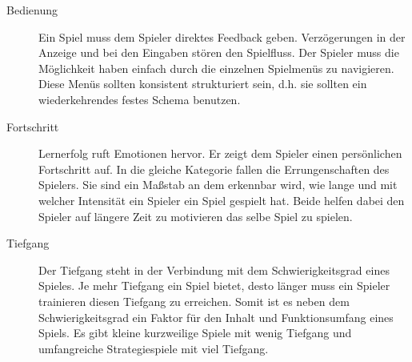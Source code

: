 \begin{description}



\item[Bedienung]
Ein Spiel muss dem Spieler direktes Feedback geben. Verzögerungen in der Anzeige und bei den Eingaben stören den Spielfluss. Der Spieler muss die Möglichkeit haben einfach durch die einzelnen Spielmenüs zu navigieren. Diese Menüs sollten konsistent strukturiert sein, d.h. sie sollten ein wiederkehrendes festes Schema benutzen.


\item[Fortschritt]

Lernerfolg ruft Emotionen hervor. Er zeigt dem Spieler einen persönlichen Fortschritt auf. In die gleiche Kategorie fallen die Errungenschaften des Spielers. Sie sind ein Maßstab an dem erkennbar wird, wie lange und mit welcher Intensität ein Spieler ein Spiel gespielt hat. Beide helfen dabei den Spieler auf längere Zeit zu motivieren das selbe Spiel zu spielen.





\item[Tiefgang]
Der Tiefgang steht in der Verbindung mit dem Schwierigkeitsgrad eines Spieles. Je mehr Tiefgang ein Spiel bietet, desto länger muss ein Spieler trainieren diesen Tiefgang zu erreichen. Somit ist es neben dem Schwierigkeitsgrad ein Faktor für den Inhalt und Funktionsumfang eines Spiels. Es gibt kleine kurzweilige Spiele mit wenig Tiefgang und umfangreiche Strategiespiele mit viel Tiefgang. 


\end{description}
